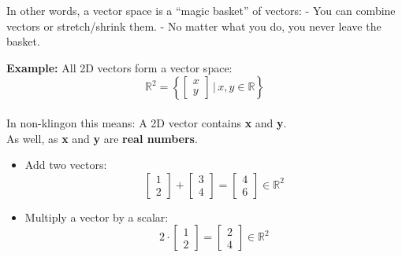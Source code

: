 \documentclass[12pt]{article}
\begin{document}
            In other words, a vector space is a “magic basket” of vectors:  
                - You can combine vectors or stretch/shrink them.  
                - No matter what you do, you never leave the basket.

            \textbf{Example:} All 2D vectors form a vector space:
            \begin{equation}
                \mathbb{R}^2 = \left\{ \begin{bmatrix}x \\ y\end{bmatrix} \,\bigg|\, x, y \in \mathbb{R} \right\}
            \end{equation} \\

            In non-klingon this means: A 2D vector contains \textbf{x} and \textbf{y}. \\
            As well, as \textbf{x} and \textbf{y} are \textbf{real numbers}.

            \begin{itemize}
                \item Add two vectors: \\
                \begin{equation}
                    \begin{bmatrix}1 \\ 2 \end{bmatrix} + \begin{bmatrix}3 \\ 4 \end{bmatrix} =         \begin{bmatrix}4 \\ 6 \end{bmatrix} \in \mathbb{R}^2
                \end{equation}
                
                \item Multiply a vector by a scalar: \\
                \begin{equation}
                    2 \cdot \begin{bmatrix}1 \\ 2 \end{bmatrix} =      \begin{bmatrix}2 \\ 4 \end{bmatrix} \in \mathbb{R}^2
                \end{equation}
            \end{itemize}
\end{document}
